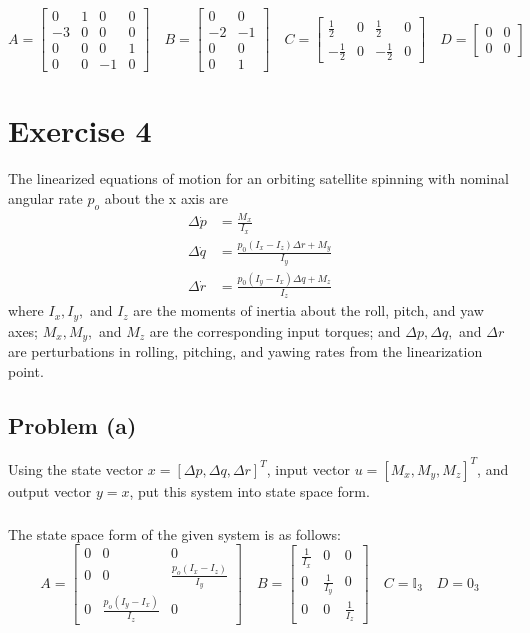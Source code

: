 \documentclass[11pt]{article}
\begin{document}
\begin{equation*}
	A=\begin{bmatrix} 0&1&0&0\\-3&0&0&0 \\ 0&0&0&1 \\ 0&0&-1&0 \end{bmatrix}\quad B=\begin{bmatrix} 0&0 \\ -2&-1 \\ 0&0 \\ 0&1 \end{bmatrix}\quad C=\begin{bmatrix} \frac{1}{2}&0&\frac{1}{2}&0 \\ -\frac{1}{2}&0&-\frac{1}{2}&0 \end{bmatrix}\quad D=\begin{bmatrix} 0&0 \\ 0&0 \end{bmatrix}
\end{equation*}

\section*{Exercise 4}
The linearized equations of motion for an orbiting satellite spinning with nominal angular rate $p_o$ about the x axis are
\begin{align*}
	\Delta\dot{p} &= \frac{M_x}{I_x} \\
	\Delta\dot{q} &= \frac{p_0(I_x-I_z)\Delta r + M_y}{I_y} \\
	\Delta\dot{r} &= \frac{p_0(I_y-I_x)\Delta q + M_z}{I_z}
\end{align*}
where $I_x,I_y,$ and $I_z$ are the moments of inertia about the roll, pitch, and yaw axes; $M_x,M_y,$ and $M_z$ are the corresponding input torques; and $\Delta p,\Delta q,$ and $\Delta r$ are perturbations in rolling, pitching, and yawing rates from the linearization point.

\subsection*{Problem (a)}
Using the state vector $x = [\Delta p, \Delta q, \Delta r]^T$, input vector $u = [M_x,M_y,M_z]^T$, and output vector $y=x$, put this system into state space form.

\subparagraph{}
The state space form of the given system is as follows:
\begin{equation*}
	A = \begin{bmatrix} 
		0 & 0 & 0 \\
		0 & 0 & \frac{p_o(I_x-I_z)}{I_y} \\
		0 & \frac{p_o(I_y-I_x)}{I_z} & 0
	\end{bmatrix} \quad 
	B = \begin{bmatrix}
		\frac{1}{I_x} & 0 & 0 \\
		0 & \frac{1}{I_y} & 0 \\
		0 & 0 & \frac{1}{I_z}
	\end{bmatrix} \quad
	C = \mathbb{I}_3 \quad 
	D = 0_3
\end{equation*}
\end{document}

